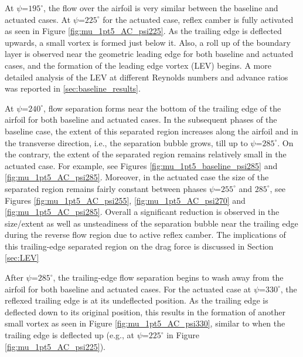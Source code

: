 At $\psi$=$195^\circ$, the flow over the airfoil is very similar between the baseline and actuated cases.
At $\psi$=$225^\circ$ for the actuated case, reflex camber is fully activated as seen in Figure \ref{fig:mu_1pt5_AC_psi225}. As the trailing edge is deflected upwards, a small vortex is formed just below it. Also, a roll up of the boundary layer is observed near the geometric leading edge for both baseline and actuated cases, and the formation of the leading edge vortex (LEV) begins. A more detailed analysis of the LEV at different Reynolds numbers and advance ratios was reported in \ref{sec:baseline_results}.

At $\psi$=$240^\circ$, flow separation forms near the bottom of the trailing edge of the airfoil for both baseline and actuated cases.
In the subsequent phases of the baseline case, the extent of this separated region increases along the airfoil and in the transverse direction, i.e., the separation bubble grows, till up to $\psi$=$285^\circ$. 
On the contrary, the extent of the separated region remains relatively small in the actuated case. For example, see Figures \ref{fig:mu_1pt5_baseline_psi285} and \ref{fig:mu_1pt5_AC_psi285}.
Moreover, in the actuated case the size of the separated region remains fairly constant between phases $\psi$=$255^\circ$ and $285^\circ$, see Figures \ref{fig:mu_1pt5_AC_psi255}, \ref{fig:mu_1pt5_AC_psi270} and \ref{fig:mu_1pt5_AC_psi285}.
Overall a significant reduction is observed in the size/extent as well as unsteadiness of the separation bubble near the trailing edge during the reverse flow region due to active reflex camber.
The implications of this trailing-edge separated region on the drag force is discussed in Section \ref{sec:LEV}

After $\psi$=$285^\circ$, the trailing-edge flow separation begins to wash away from the airfoil for both baseline and actuated cases.
For the actuated case at $\psi$=$330^\circ$, the reflexed trailing edge is at its undeflected position.
As the trailing edge is deflected down to its original position, this results in the formation of another small vortex as seen in Figure \ref{fig:mu_1pt5_AC_psi330}, similar to when the trailing edge is deflected up (e.g., at $\psi$=$225^\circ$ in Figure \ref{fig:mu_1pt5_AC_psi225}).

